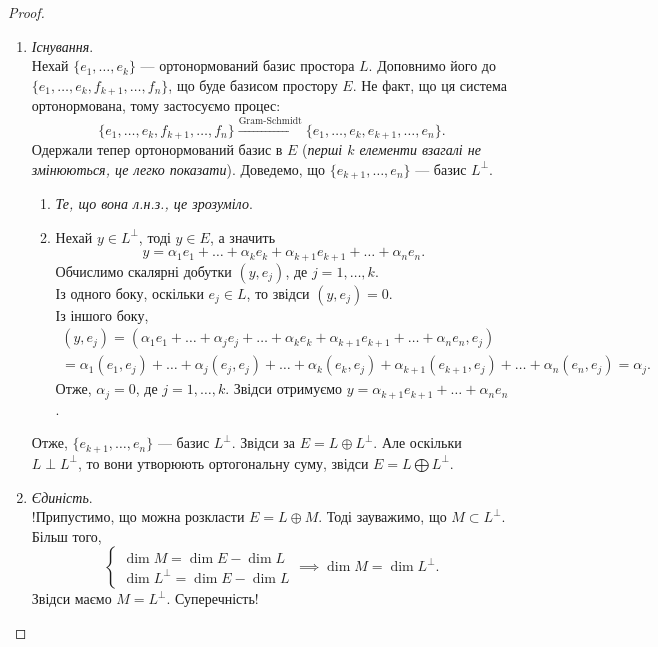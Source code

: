 \documentclass{math_library}
\begin{document}
\begin{proof}
\begin{enumerate}[topsep=0pt,wide=0pt,label={\Roman*.}]
\item \textit{Існування}.\\
Нехай $\{e_1,\dots,e_k\}$ --- ортонормований базис простора $L$. Доповнимо його до $\{e_1,\dots,e_k,f_{k+1},\dots,f_n\}$, що буде базисом простору $E$. Не факт, що ця система ортонормована, тому застосуємо процес:
\[
\{e_1,\dots,e_k,f_{k+1},\dots, f_n\} \xrightarrow{\text{Gram-Schmidt}} \{e_1,\dots,e_k, e_{k+1},\dots,e_n\}.
\]
Одержали тепер ортонормований базис в $E$ (\textit{перші $k$ елементи взагалі не змінюються, це легко показати}). Доведемо, що $\{e_{k+1},\dots, e_n\}$ --- базис $L^\perp$.
\begin{enumerate}[nosep,wide=0pt,label={\roman*)}]
\item \textit{Те, що вона л.н.з., це зрозуміло}.
\item Нехай $y \in L^\perp$, тоді $y \in E$, а значить 
\[
y = \alpha_1 e_1 + \dots + \alpha_k e_k + \alpha_{k+1} e_{k+1} + \dots + \alpha_n e_n.
\]
Обчислимо скалярні добутки $(y,e_j)$, де $j=1,\dots,k$.\\
Із одного боку, оскільки $e_j \in L$, то звідси $(y,e_j) = 0$.\\
Із іншого боку, 
\begin{align*}
(y,e_j) = (\alpha_1 e_1 + \dots + \alpha_j e_j + \dots + \alpha_k e_k + \alpha_{k+1} e_{k+1} + \dots + \alpha_n e_n, e_j) \\
= \alpha_1 (e_1,e_j) + \dots + \alpha_j (e_j,e_j) + \dots + \alpha_k (e_k,e_j) + \alpha_{k+1} (e_{k+1},e_j) + \dots + \alpha_n (e_n,e_j) = \alpha_j.
\end{align*}
Отже, $\alpha_j = 0$, де $j=1,\dots,k$. Звідси отримуємо $y = \alpha_{k+1} e_{k+1} + \dots + \alpha_n e_n$.
\end{enumerate}
Отже, $\{e_{k+1},\dots, e_n\}$ --- базис $L^\perp$. Звідси за  $E= L  \oplus  L^{\perp}$. Але оскільки $
L \perp L^\perp$, то вони утворюють ортогональну суму, звідси $E = L \bigoplus L^\perp$.

\item \textit{Єдиність}.\\
!Припустимо, що можна розкласти $E = L \oplus M$. Тоді зауважимо, що $M \subset L^\perp$. Більш того,
\[ 
\begin{cases}
\dim M = \dim E - \dim L \\
\dim L^{\perp} = \dim E - \dim L
\end{cases} \implies \dim M = \dim L^\perp.
\]
Звідси маємо $M = L^\perp$. Суперечність! \qedhere
\end{enumerate}
\end{proof}
\end{document}
